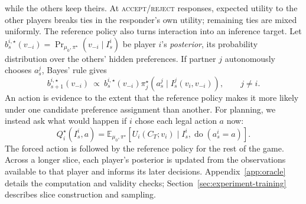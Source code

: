 while the others keep theirs. At
\textsc{accept}/\textsc{reject} responses, expected utility to the other
players breaks ties in the responder's own utility; remaining ties are mixed
uniformly. The reference policy also turns interaction into an inference target. Let
$b_s^{i,\star}(v_{-i})=\Pr_{\mu_0,\pi^\star}(v_{-i}\mid I_s^i)$ be player $i$'s
\emph{posterior}, its probability distribution over the others' hidden
preferences. If partner $j$ autonomously chooses $a_s^j$, Bayes' rule gives
\begin{equation}
 b_{s+1}^{i,\star}(v_{-i})\ \propto\
 b_s^{i,\star}(v_{-i})
 \pi_j^\star(a_s^j\mid I_s^j(v_i,v_{-i})),\qquad j\ne i.
 \label{eq:oracle-update-main}
\end{equation}
An action is evidence to the extent that the reference policy makes it more
likely under one candidate preference assignment than another. For planning,
we instead ask what would happen if $i$ chose each legal action $a$ now:
\begin{equation}
 Q_i^\star(I_s^i,a)=
 \mathbb E_{\mu_0,\pi^\star}
 [U_i(C_T;v_i)\mid I_s^i,\operatorname{do}(a_s^i=a)].
 \label{eq:oracle-targets}
\end{equation}
The forced action is followed by the reference policy for the rest of the
game. Across a longer slice, each player's posterior is updated from the
observations available to that player and informs its later decisions.
Appendix~\ref{app:oracle} details the computation and validity checks;
Section~\ref{sec:experiment-training} describes slice construction and sampling.
